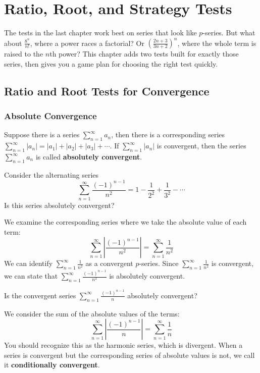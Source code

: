 \chapter{Ratio, Root, and Strategy Tests}

The tests in the last chapter work best on series that look like
$p$-series. But what about $\frac{8^n}{n!}$, where a power races a factorial?
Or $\left(\frac{2n+3}{3n+2}\right)^n$, where the whole term is raised to the
$n$th power? This chapter adds two tests built for exactly those series, then
gives you a game plan for choosing the right test quickly.

\section{Ratio and Root Tests for Convergence}
\subsection{Absolute Convergence}
Suppose there is a series $\sum_{n=1}^\infty a_n$, 
then there is a corresponding series $\sum_{n=1}^\infty |a_n| = |a_1| + |a_2| 
+ |a_3| + \cdots$. If $\sum_{n=1}^\infty |a_n|$ is convergent, then the series 
$\sum_{n=1}^\infty a_n$ is called \textbf{absolutely convergent}. 

\begin{Worked}
\begin{Problem}
Consider the alternating series 
$$\sum_{n=1}^\infty \frac{(-1)^{n-1}}{n^2} = 1 - \frac{1}{2^2} + 
\frac{1}{3^2} - \cdots$$
Is this series absolutely convergent?
\end{Problem}
\begin{Solution}
We examine the corresponding series where we take the 
absolute value of each term:
$$\sum_{n=1}^\infty \left|\frac{(-1)^{n-1}}{n^2} \right| = \sum_{n=1}^
\infty \frac{1}{n^2}$$
We can identify $\sum_{n=1}^\infty \frac{1}{n^2}$ as a convergent $p$-series. 
Since $\sum_{n=1}^\infty \frac{1}{n^2}$ is convergent, we can state that 
$\sum_{n=1}^\infty \frac{(-1)^{n-1}}{n^2}$ is absolutely convergent. 
\end{Solution}
\end{Worked}

\begin{Worked}
\begin{Problem}
Is the convergent series $\sum_{n=1}^\infty 
\frac{(-1)^{n-1}}{n}$ absolutely convergent?
\end{Problem}
\begin{Solution}
We consider the sum of the absolute values of the terms:
$$\sum_{n=1}^\infty \left|\frac{(-1)^{n-1}}{n}\right| = \sum_{n=1}^\infty 
\frac{1}{n}$$
You should recognize this as the harmonic series, which is divergent. When a 
series is convergent but the corresponding series of absolute values is not, 
we call it \textbf{conditionally convergent}. 
\end{Solution}
\end{Worked}

